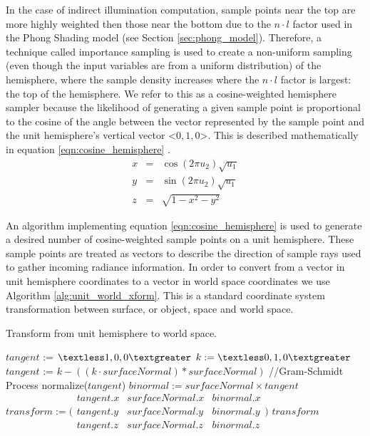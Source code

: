 In the case of indirect illumination computation, sample points near the top are more highly weighted then those near the bottom due to the $n \cdot l$ factor used in the Phong Shading model (see Section \ref{sec:phong_model}). Therefore, a technique called importance sampling \cite{bib:pbr} is used to create a non-uniform sampling (even though the input variables are from a uniform distribution) of the hemisphere, where the sample density increases where the $n \cdot l$ factor is largest: the top of the hemisphere. We refer to this as a cosine-weighted hemisphere sampler because the likelihood of generating a given sample point is proportional to the cosine of the angle between the vector represented by the sample point and the unit hemisphere's vertical vector \textless$0,1,0$\textgreater. This is described mathematically in equation \ref{eqn:cosine_hemisphere} \cite{bib:pbr}.
\begin{eqnarray}
x &=& \cos (2 \pi u_{2}) \sqrt{u_{1}} \nonumber \\
y &=& \sin (2 \pi u_{2}) \sqrt{u_{1}} \nonumber \\
z &=& \sqrt{1-x^{2}-y^{2}}
\label{eqn:cosine_hemisphere}
\end{eqnarray}

An algorithm implementing equation \ref{eqn:cosine_hemisphere} is used to generate a desired number of cosine-weighted sample points on a unit hemisphere. These sample points are treated as vectors to describe the direction of sample rays used to gather incoming radiance information. In order to convert from a vector in unit hemisphere coordinates to a vector in world space coordinates we use Algorithm \ref{alg:unit_world_xform}. This is a standard coordinate system transformation between surface, or object, space and world space.

\begin{algorithm}[H]
\captionfont
\caption[Unit to World Hemisphere]{Transform from unit hemisphere to world space.}
\label{alg:unit_world_xform}
{\fontsize{10}{9}\selectfont
\begin{algorithmic}
         \State $tangent$ :=  $\textless1,0,0\textgreater$
      \Else
         \State $k := \textless0,1,0\textgreater$
         \State $tangent$ :=  $k - ((k \cdot surfaceNormal)*surfaceNormal)$ //Gram-Schmidt Process
         \State normalize($tangent$)
      \EndIf
      \State $binormal := surfaceNormal \times tangent$
      \State $transform := \bigl( \begin{smallmatrix} tangent.x & surfaceNormal.x & binormal.x \\ tangent.y & surfaceNormal.y & binormal.y \\ tangent.z & surfaceNormal.z & binormal.z \end{smallmatrix} \bigr)$
      \State \Return $transform$
   \EndFunction
\end{algorithmic}
}
\end{algorithm}

